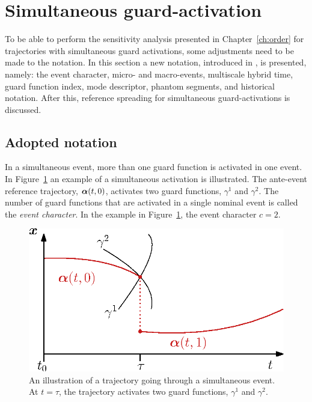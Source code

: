 \documentclass[../DC2017114Bouma.tex]{subfiles}
\begin{document}
\section{Simultaneous guard-activation}
To be able to perform the sensitivity analysis presented in Chapter~\ref{ch:order} for trajectories with simultaneous guard activations, some adjustments need to be made to the notation. In this section a new notation, introduced in \cite{Rijnen2018}, is presented, namely: the event character, micro- and macro-events, multiscale hybrid time, guard function index, mode descriptor, phantom segments, and historical notation. After this, reference spreading for simultaneous guard-activations is discussed.

\subsection{Adopted notation}
In a simultaneous event, more than one guard function is activated in one event. In Figure~\ref{fig:4simulexample} an example of a simultaneous activation is illustrated. The ante-event reference trajectory, $\boldsymbol{\alpha}(t,0)$, activates two guard functions, $\gamma^1$ and $\gamma^2$. The number of guard functions that are activated in a single nominal event is called the \textit{event character}. In the example in Figure~\ref{fig:4simulexample}, the event character $c = 2$.

\begin{figure}[h]
\centering
\includegraphics[width=.45\textwidth]{simulexample.eps}\caption{An illustration of a trajectory going through a simultaneous event. At $t=\tau$, the trajectory activates two guard functions, $\gamma^1$ and $\gamma^2$.} \label{fig:4simulexample}
\end{figure}
\end{document}
